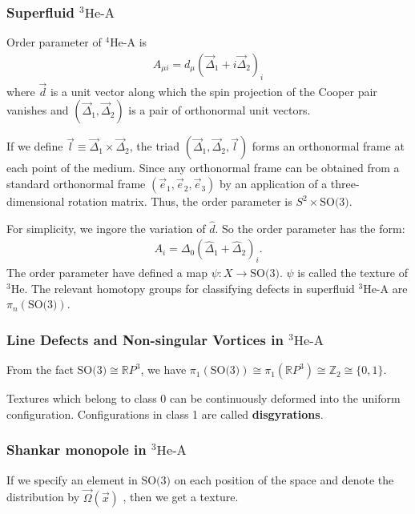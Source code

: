 \documentclass[10pt]{article}
\begin{document}
\subsubsection{Superfluid \texorpdfstring{{}$^3\text{He-A}$}{}}
Order parameter of $^4$He-A is
\begin{align}
    A_{\mu i}=d_\mu (\vec{\Delta}_1+i\vec{\Delta}_2)_i
\end{align}
where $\vec{d}$ is a unit vector along which the spin projection of the Cooper pair vanishes and $\left(\vec{\Delta}_1,\vec{\Delta}_2\right)$ is a pair of orthonormal unit vectors.

If we define $\vec{l}\equiv\vec{\Delta}_1\times\vec{\Delta}_2$, the triad $(\vec{\Delta}_1,\vec{\Delta}_2,\vec{l})$ forms an orthonormal frame at each point of the medium.
Since any orthonormal frame can be obtained from a standard orthonormal frame $(\vec{e}_1,\vec{e}_2,\vec{e}_3)$ by an application of a three-dimensional rotation matrix.
Thus, the order parameter is $S^2\times\text{SO(3)}$.

For simplicity, we ingore the variation of $\hat{d}$.
So the order parameter has the form:
\begin{align}
    A_i=\Delta_0\left(\hat{\Delta}_1+\hat{\Delta}_2\right)_i.
\end{align}
The order parameter have defined a map $\psi:X\to\text{SO(3)}$.
$\psi$ is called the texture of $^3\text{He}$.
The relevant homotopy groups for classifying defects in superfluid $^3\text{He-A}$ are $\pi_n(\text{SO(3)})$.

\subsubsection{Line Defects and Non-singular Vortices in \texorpdfstring{$^3\text{He-A}$}{}}
From the fact $\text{SO(3)}\cong\mathbb{R}P^3$, we have $\pi_1(\text{SO(3)})\cong\pi_1(\mathbb{R}P^3)\cong\mathbb{Z}_2\cong\{0,1\}$.

Textures which belong to class 0 can be continuously deformed into the uniform configuration.
Configurations in class 1 are called \textbf{disgyrations}.

\subsubsection{Shankar monopole in \texorpdfstring{$^3\text{He-A}$}{}}
If we specify an element in $\text{SO(3)}$ on each position of the space and denote the distribution by $\vec{\Omega}\left(\vec{x}\right)$ , then we get a texture.
\end{document}
